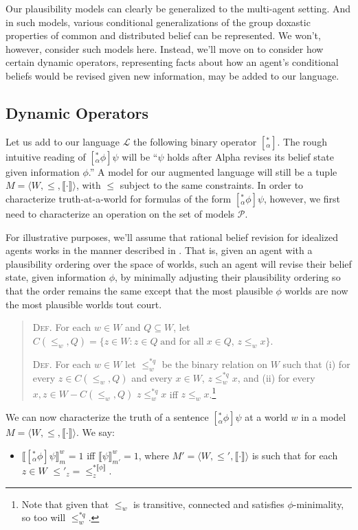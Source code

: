 Our plausibility models can clearly be generalized to the multi-agent setting.
And in such models, various conditional generalizations of the group doxastic properties of common and distributed belief can be represented.
We won't, however, consider such models here.
Instead, we'll move on to consider how certain dynamic operators, representing facts about how an agent's conditional beliefs would be revised given new information, may be added to our language.

\subsection{Dynamic Operators}\label{caie-section3-2}

Let us add to our language $\mathcal{L}$ the following binary operator $[^*_\alpha]$.
The rough intuitive reading of $[^*_\alpha \phi] \psi$ will be ``$\psi$ holds after Alpha revises its belief state given information $\phi$.''
A model for our augmented language will still be a tuple $M = \langle W, \leq, \llbracket \cdot \rrbracket \rangle$, with $\leq$ subject to the same constraints.
In order to characterize truth-at-a-world for formulas of the form $[^*_\alpha \phi] \psi$, however, we first need to characterize an operation on the set of models $\mathcal{P}$.

For illustrative purposes, we'll assume that rational belief revision for idealized agents works in the manner described in \citet{Boutilier1}.
That is, given an agent with a plausibility ordering over the space of worlds, such an agent will revise their belief state, given information $\phi$, by minimally adjusting their plausibility ordering so that the order remains the same except that the most plausible $\phi$ worlds are now the most plausible worlds tout court.
\begin{quote}
\textsc{Def.}\; For each $w \in W$ and $Q \subseteq W$, let $C(\leq_w, Q) = \{ z \in W: z \in Q \; \text{and for all} \; x \in Q$, $z \leq_w x \}$.

\textsc{Def.}\; For each $w \in W$ let $\leq^{*q}_w$ be the binary relation on $W$ such that (i) for every $z \in C(\leq_w, Q)$ and every $x \in W$, $z  \leq^{*q}_w x$, and (ii) for every $x, z \in W - C(\leq_w, Q)$ $z  \leq^{*q}_w x$ iff $z \leq_w x$.\footnote{Note that given that $\leq_w$ is transitive, connected and satisfies $\phi$-minimality, so too will $\leq^{*q}_w$.}
\end{quote}

We can now characterize the truth of a sentence $[^*_\alpha \phi] \psi$ at a world $w$ in a model $M = \langle W, \leq, \llbracket \cdot \rrbracket \rangle$. We say:
\begin{itemize}
\item[] $\llbracket [^*_\alpha \phi] \psi \rrbracket^w_m = 1$ iff $\llbracket \psi \rrbracket^w_{m'} = 1$, where $M' = \langle W, \leq', \llbracket \cdot \rrbracket \rangle$ is such that for each $z \in W$ $\leq'_z = \leq^{*\llbracket \phi \rrbracket}_z$.
\end{itemize}

